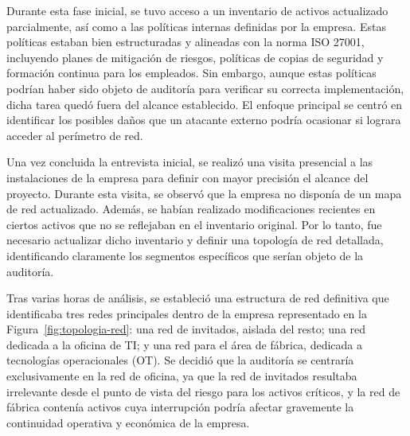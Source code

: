\documentclass[a4paper, 11pt]{article}
\begin{document}
Durante esta fase inicial, se tuvo acceso a un inventario de activos actualizado parcialmente, así como a las políticas internas definidas por la empresa. Estas políticas estaban bien estructuradas y alineadas con la norma ISO 27001, incluyendo planes de mitigación de riesgos, políticas de copias de seguridad y formación continua para los empleados. Sin embargo, aunque estas políticas podrían haber sido objeto de auditoría para verificar su correcta implementación, dicha tarea quedó fuera del alcance establecido. El enfoque principal se centró en identificar los posibles daños que un atacante externo podría ocasionar si lograra acceder al perímetro de red.
\par\vspace{0.5cm}

Una vez concluida la entrevista inicial, se realizó una visita presencial a las instalaciones de la empresa para definir con mayor precisión el alcance del proyecto. 
Durante esta visita, se observó que la empresa no disponía de un mapa de red actualizado. Además, se habían realizado modificaciones recientes en 
ciertos activos que no se reflejaban en el inventario original. 
Por lo tanto, fue necesario actualizar dicho inventario y definir una topología de red detallada, identificando claramente los segmentos específicos que 
serían objeto de la auditoría.
\par\vspace{0.5cm}

Tras varias horas de análisis, se estableció una estructura de red definitiva que identificaba tres redes principales dentro de la empresa representado en la Figura~\ref{fig:topologia-red}: una red de invitados, aislada del resto; una red dedicada a la oficina de TI; y una red para el área de fábrica, dedicada a tecnologías operacionales (OT). Se decidió que la auditoría se centraría exclusivamente en la red de oficina, ya que la red de invitados resultaba irrelevante desde el punto de vista del riesgo para los activos críticos, y la red de fábrica contenía activos cuya interrupción podría afectar gravemente la continuidad operativa y económica de la empresa.
\par\vspace{0.5cm}
\end{document}
